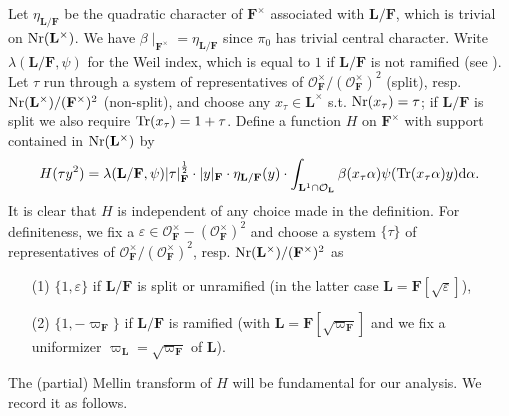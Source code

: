 \documentclass[A4]{amsart}
\numberwithin{equation}{section} \everymath{\displaystyle}
\newcommand{\Nr}{{\rm Nr}}
\newcommand{\Tr}{{\rm Tr}}
\newcommand{\ud}{\mathrm{d}}
\newcommand{\F}{\mathbf{F}}
\newcommand{\bL}{\mathbf{L}}
\newcommand{\vO}{\mathcal{O}}
\newcommand{\norm}[1][\cdot]{\lvert #1 \rvert}
\begin{document}
	Let $\eta_{\bL/\F}$ be the quadratic character of $\F^{\times}$ associated with $\bL/\F$, which is trivial on $\Nr(\bL^{\times})$. We have $\beta \mid_{\F^{\times}} = \eta_{\bL/\F}$ since $\pi_0$ has trivial central character. Write $\lambda(\bL/\F, \psi)$ for the Weil index, which is equal to $1$ if $\bL/\F$ is not ramified (see \cite[Corollary 3.2]{CC07}). Let $\tau$ run through a system of representatives of $\vO_{\F}^{\times}/(\vO_{\F}^{\times})^2$ (split), resp. $\Nr(\bL^{\times})/(\F^{\times})^2$ (non-split), and choose any $x_{\tau} \in \bL^{\times}$ s.t. $\Nr(x_{\tau})=\tau$; if $\bL/\F$ is split we also require $\Tr(x_{\tau}) = 1+\tau$. Define a function $H$ on $\F^{\times}$ with support contained in $\Nr(\bL^{\times})$ by 
\begin{equation} \label{eq: TestFROI}
	H(\tau y^2) = \lambda(\bL/\F,\psi) \norm[\tau]_{\F}^{\frac{1}{2}} \cdot \norm[y]_{\F} \cdot \eta_{\bL/\F}(y) \cdot \int_{\bL^1 \cap \vO_{\bL}} \beta(x_{\tau} \alpha) \psi(\Tr(x_{\tau} \alpha) y) \ud \alpha.
\end{equation}
	It is clear that $H$ is independent of any choice made in the definition. For definiteness, we fix a $\varepsilon \in \vO_{\F}^{\times} - (\vO_{\F}^{\times})^2$ and choose a system $\{ \tau \}$ of representatives of $\vO_{\F}^{\times}/(\vO_{\F}^{\times})^2$, resp. $\Nr(\bL^{\times})/(\F^{\times})^2$ as
\begin{itemize}
	\item[(1)] $\{ 1, \varepsilon \}$ if $\bL/\F$ is split or unramified (in the latter case $\bL = \F[\sqrt{\varepsilon}]$),
	\item[(2)] $\{ 1, -\varpi_{\F} \}$ if $\bL/\F$ is ramified (with $\bL = \F[\sqrt{\varpi_{\F}}]$ and we fix a uniformizer $\varpi_{\bL} = \sqrt{\varpi_{\F}}$ of $\bL$).
\end{itemize}
	The (partial) Mellin transform of $H$ will be fundamental for our analysis. We record it as follows.
\end{document}
